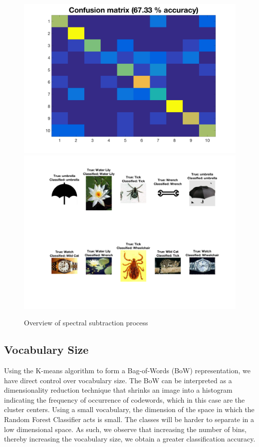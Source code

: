 \documentclass[a4paper,pra,twocolumn,10pt,aps,longbibliography,nobalancelastpage]{revtex4-1}
\begin{document}
\begin{figure}[H]
	\centering
    \includegraphics[width=0.49\columnwidth]{confus}    
    \includegraphics[width=0.49\columnwidth]{images}
    \caption{Overview of spectral subtraction process}
\end{figure}


\subsection*{Vocabulary Size}

Using the K-means algorithm to form a Bag-of-Words (BoW) representation, we have direct control over vocabulary size. The BoW can be interpreted as a dimensionality reduction technique that shrinks an image into a histogram indicating the frequency of occurrence of codewords, which in this case are the cluster centers. Using a small vocabulary, the dimension of the space in which the Random Forest Classifier acts is small. The classes will be harder to separate in a low dimensional space. As such, we observe that increasing the number of bins, thereby increasing the vocabulary size, we obtain a greater classification accuracy. 
\end{document}
